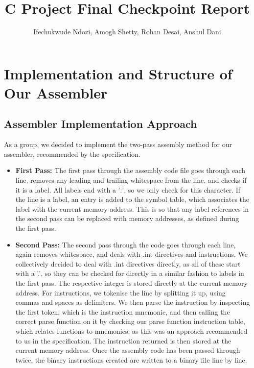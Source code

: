 \documentclass[11pt]{article}
\title{C Project Final Checkpoint Report}
\author{Ifechukwude Ndozi, Amogh Shetty, Rohan Desai, Anshul Dani}
\begin{document}
\maketitle


\section{Implementation and Structure of Our Assembler}

\subsection{Assembler Implementation Approach}

As a group, we decided to implement the two-pass assembly method for our assembler, recommended by the specification.

\begin{itemize}
    \item \textbf{First Pass:} 
The first pass through the assembly code file goes through each line, removes any leading and trailing whitespace from the line, and checks if it is a label. All labels end with a ':', so we only check for this character. If the line is a label, an entry is added to the symbol table, which associates the label with the current memory address. This is so that any label references in the second pass can be replaced with memory addresses, as defined during the first pass.

\item \textbf{Second Pass:}
The second pass through the code goes through each line, again removes whitespace, and deals with .int directives and instructions. We collectively decided to deal with .int directives directly, as all of these start with a '.', so they can be checked for directly in a similar fashion to labels in the first pass. The respective integer is stored directly at the current memory address. For instructions, we tokenise the line by splitting it up, using commas and spaces as delimiters. We then parse the instruction by inspecting the first token, which is the instruction mnemonic, and then calling the correct parse function on it by checking our parse function instruction table, which relates functions to mnemonics, as this was an approach recommended to us in the specification. The instruction returned is then stored at the current memory address. Once the assembly code has been passed through twice, the binary instructions created are written to a binary file line by line.

\end{itemize}
\end{document}
